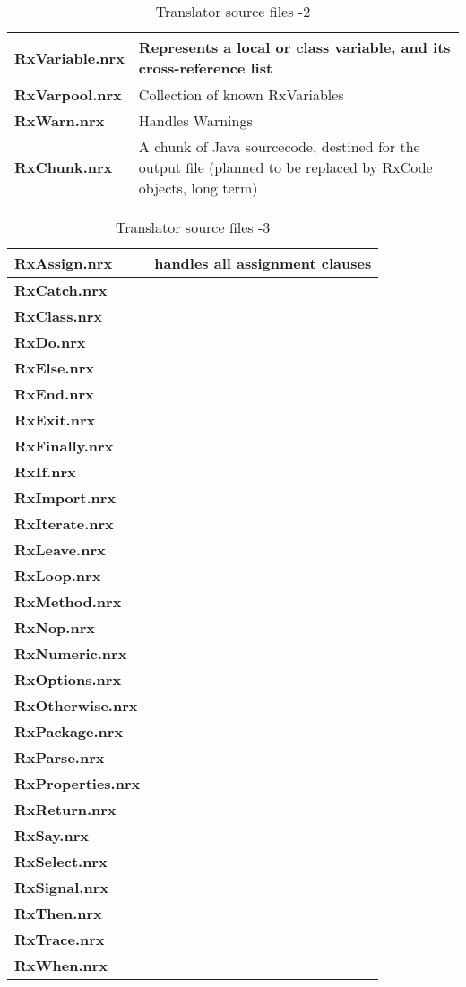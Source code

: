 \begin{table}\caption{Translator source files -2}
\begin{tabularx}{\textwidth}{>{\bfseries}lX}
\toprule
  RxVariable.nrx      & Represents a local or class variable, and its
                         cross-reference list
\\\midrule
  RxVarpool.nrx       & Collection of known RxVariables
\\\midrule
  RxWarn.nrx          & Handles Warnings
\\\midrule
  RxChunk.nrx         & A chunk of Java sourcecode, destined for the
  output file (planned to be replaced by RxCode objects, long term)
\\\midrule
\end{tabularx}
\end{table}
\begin{table}\caption{Translator source files -3}
\begin{tabularx}{\textwidth}{>{\bfseries}lX}
\toprule
  RxAssign.nrx& handles all assignment clauses
\\\midrule
  RxCatch.nrx       &
\\\midrule
  RxClass.nrx &
\\\midrule
  RxDo.nrx&
\\\midrule
  RxElse.nrx&
\\\midrule
  RxEnd.nrx&
\\\midrule
  RxExit.nrx&
\\\midrule
  RxFinally.nrx&
\\\midrule
  RxIf.nrx&
\\\midrule
  RxImport.nrx&
\\\midrule
  RxIterate.nrx&
\\\midrule
  RxLeave.nrx&
\\\midrule
  RxLoop.nrx&
\\\midrule
  RxMethod.nrx&
\\\midrule
  RxNop.nrx&
\\\midrule
  RxNumeric.nrx&
\\\midrule
  RxOptions.nrx&
\\\midrule
  RxOtherwise.nrx&
\\\midrule
  RxPackage.nrx&
\\\midrule
  RxParse.nrx&
\\\midrule
  RxProperties.nrx&
\\\midrule
  RxReturn.nrx&
\\\midrule
  RxSay.nrx&
\\\midrule
  RxSelect.nrx&
\\\midrule
  RxSignal.nrx&
\\\midrule
  RxThen.nrx&
\\\midrule
  RxTrace.nrx&
\\\midrule
  RxWhen.nrx&
\\\bottomrule
\end{tabularx}
\end{table}


